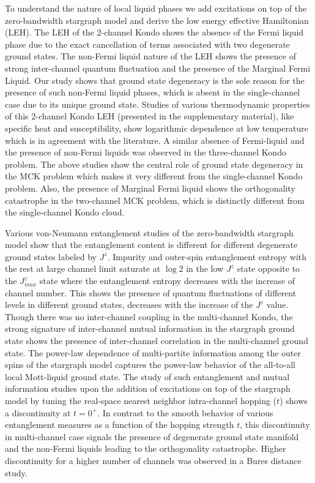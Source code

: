 \documentclass[reprint,prb,superscriptaddress]{revtex4-1}
\begin{document}
\par To understand the nature of local liquid phases we add excitations on top of the zero-bandwidth stargraph model and derive the low energy effective Hamiltonian (LEH). The LEH of the 2-channel Kondo shows the absence of the Fermi liquid phase due to the exact cancellation of terms associated with two degenerate ground states. The non-Fermi liquid nature of the LEH shows the presence of strong inter-channel quantum fluctuation and the presence of the Marginal Fermi Liquid. Our study shows that ground state degeneracy is the sole reason for the presence of such non-Fermi liquid phases, which is absent in the single-channel case due to its unique ground state. Studies of various thermodynamic properties of this 2-channel Kondo LEH (presented in the supplementary material), like specific heat and susceptibility, show logarithmic dependence at low temperature which is in agreement with the literature.
A similar absence of Fermi-liquid and the presence of non-Fermi liquids was observed in the three-channel Kondo problem. The above studies show the central role of ground state degeneracy in the MCK problem which makes it very different from the single-channel Kondo problem. Also, the presence of Marginal Fermi liquid shows the orthogonality catastrophe in the two-channel MCK problem, which is distinctly different from the single-channel Kondo cloud.

\par Various von-Neumann entanglement studies of the zero-bandwidth stargraph model show that the entanglement content is different for different degenerate ground states labeled by $J^z$. Impurity and outer-spin entanglement entropy with the rest at large channel limit saturate at $\log 2$ in the low $J^z$ state opposite to the $J^z_{max}$ state where the entanglement entropy decreases with the increase of channel number. This shows the presence of quantum fluctuations of different levels in different ground states, decreases with the increase of the $J^z$ value. Though there was no inter-channel coupling in the multi-channel Kondo, the strong signature of inter-channel mutual information in the stargraph ground state shows the presence of inter-channel correlation in the multi-channel ground state. The power-law dependence of multi-partite information among the outer spins of the stargraph model captures the power-law behavior of the all-to-all local Mott-liquid ground state. The study of such entanglement and mutual information studies upon the addition of excitations on top of the stargraph model by tuning the real-space nearest neighbor intra-channel hopping ($t$) shows a discontinuity at $t=0^+$. In contrast to the smooth behavior of various entanglement measures as a function of the hopping strength $t$, this discontinuity in multi-channel case signals the presence of degenerate ground state manifold and the non-Fermi liquids leading to the orthogonality catastrophe. Higher discontinuity for a higher number of channels was observed in a Bures distance study.
\end{document}
